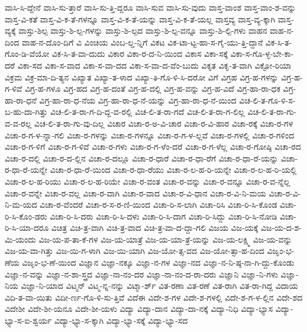 {ವಾಸಿ-ಸಿ-ದ್ದೇನೆ
ವಾಸಿ-ಸು-ತ್ತಾರೆ
ವಾಸಿ-ಸು-ತ್ತಿ-ದ್ದರೂ
ವಾಸಿ-ಸುವ
ವಾಸಿ-ಸು-ವುದು
ವಾಸ್ತ-ವಾಂಶ
ವಾಸ್ತ-ವಾಂ-ಶ-ವನ್ನು
ವಾಸ್ತ-ವಿ-ಕತೆ
ವಾಸ್ತ-ವಿ-ಕ-ತೆ-ಗಳನ್ನೂ
ವಾಸ್ತ-ವಿ-ಕ-ತೆ-ಯನ್ನು
ವಾಸ್ತ-ವಿ-ಕ-ತೆ-ಯಲ್ಲ
ವಾಸ್ತವ್ಯ
ವಾಸ್ತ-ವ್ಯ-ಕ್ಕಾಗಿ
ವಾಸ್ತ-ವ್ಯಕ್ಕೆ
ವಾಸ್ತು-ಶಿಲ್ಪ
ವಾಸ್ತು-ಶಿ-ಲ್ಪ-ಗಳನ್ನು
ವಾಸ್ತು-ಶಿ-ಲ್ಪದ
ವಾಸ್ತು-ಶಿ-ಲ್ಪ-ವನ್ನೂ
ವಾಸ್ತು-ಶಿ-ಲ್ಪಿ-ಗಳು
ವಾಹನ
ವಾಹ-ನ-ದಿಂದ
ವಾಹ-ನ-ದೊಂ-ದಿಗೆ
ವಿ
ವಿಂಚಿಯ
ವಿಂಬ-ಲ್ಡ-ನ್ನಿಗೆ
ವಿಕಟ
ವಿಕ-ಟಾ-ಟ್ಟ-ಹಾ-ಸ-ಗೈ-ಯು-ತ್ತಿ-ದ್ದಾನೆ
ವಿಕ-ಸಿ-ತ-ಗೊಂ-ಡಿ-ವೆಯೋ
ವಿಕ-ಸಿ-ತ-ವಾ-ದುದು
ವಿಕಾರ
ವಿಕಾ-ರ-ದ-ನಿ-ಯಿಂದ
ವಿಕಾಸ
ವಿಕಾ-ಸಕ್ಕೆ
ವಿಕಾ-ಸ-ಗೊ-ಳ್ಳ-ಬೇ-ಕಾ-ದರೆ
ವಿಕಾ-ಸದ
ವಿಕಾ-ಸ-ವಾದ
ವಿಕಾ-ಸ-ವಾ-ದದ
ವಿಕಾ-ಸ-ವಾ-ದ-ವೆಂ-ಬುದು
ವಿಕೃತ
ವಿಕೃ-ತ-ವಾಗಿ
ವಿಕ್ಟೋ-ರಿಯಾ
ವಿಕ್ರಮ
ವಿಕ್ರ-ಮಾ-ದಿ-ತ್ಯನ
ವಿಖ್ಯಾತ
ವಿಖ್ಯಾ-ತ-ಳಾದ
ವಿಖ್ಯಾ-ತಿ-ಗೊ-ಳಿ-ಸಿ-ದರೋ
ವಿಗೆ
ವಿಗ್ರಹ
ವಿಗ್ರ-ಹ-ಗಳನ್ನು
ವಿಗ್ರ-ಹ-ಗ-ಳಿವೆ
ವಿಗ್ರ-ಹ-ಗಳೂ
ವಿಗ್ರ-ಹದ
ವಿಗ್ರ-ಹ-ದಂತೆ
ವಿಗ್ರ-ಹ-ದಲ್ಲಿ
ವಿಗ್ರ-ಹ-ವನ್ನು
ವಿಗ್ರ-ಹ-ವಿದೆ
ವಿಗ್ರ-ಹಾ-ರಾ-ಧಕ
ವಿಗ್ರ-ಹಾ-ರಾ-ಧನೆ
ವಿಗ್ರ-ಹಾ-ರಾ-ಧ-ನೆಯ
ವಿಗ್ರ-ಹಾ-ರಾ-ಧ-ನೆ-ಯನ್ನು
ವಿಗ್ರ-ಹಾ-ರಾ-ಧ-ನೆ-ಯಿಂದ
ವಿಚ-ಲಿ-ತ-ಗೊ-ಳಿ-ಸ-ಬ-ಹು-ದಾ-ಗಿತ್ತು
ವಿಚ-ಲಿ-ತ-ರಾ-ಗ-ದಿ-ದ್ದ-ವ-ರಲ್ಲಿ
ವಿಚ-ಲಿ-ತ-ರಾ-ಗದೆ
ವಿಚ-ಲಿ-ತ-ರಾ-ಗ-ಲಿಲ್ಲ
ವಿಚ-ಲಿ-ತ-ರಾ-ಗು-ವ-ವ-ರಲ್ಲ
ವಿಚ-ಲಿ-ತ-ರಾ-ಗು-ವು-ದಿಲ್ಲ
ವಿಚಾರ
ವಿಚಾ-ರ-ಅ-ವಿ-ಚಾರ
ವಿಚಾ-ರ-ವಿ-ಹಾರ
ವಿಚಾ-ರಕ್ಕೆ
ವಿಚಾ-ರ-ಗಳ
ವಿಚಾ-ರ-ಗ-ಳ-ನ್ನಾ-ಗಲಿ
ವಿಚಾ-ರ-ಗಳನ್ನು
ವಿಚಾ-ರ-ಗಳನ್ನೂ
ವಿಚಾ-ರ-ಗ-ಳ-ಲ್ಲವೆ
ವಿಚಾ-ರ-ಗಳಲ್ಲಿ
ವಿಚಾ-ರ-ಗಳಿಂದ
ವಿಚಾ-ರ-ಗ-ಳಿಗೆ
ವಿಚಾ-ರ-ಗ-ಳಿವೆ
ವಿಚಾ-ರ-ಗಳು
ವಿಚಾ-ರ-ಗ-ಳೆಂ-ದರೆ
ವಿಚಾ-ರ-ಗ-ಳೆಲ್ಲ
ವಿಚಾ-ರ-ಗೋಷ್ಠಿ
ವಿಚಾ-ರದ
ವಿಚಾ-ರ-ದಲ್ಲಿ
ವಿಚಾ-ರ-ದ-ಲ್ಲಿನ
ವಿಚಾ-ರ-ದಲ್ಲೂ
ವಿಚಾ-ರ-ಧಾರೆ
ವಿಚಾ-ರ-ಧಾ-ರೆಗೆ
ವಿಚಾ-ರ-ಧಾ-ರೆ-ಯನ್ನು
ವಿಚಾ-ರ-ಧಾ-ರೆ-ಯನ್ನೇ
ವಿಚಾ-ರ-ಧಾ-ರೆ-ಯಿಂದ
ವಿಚಾ-ರ-ಧಾ-ರೆಯು
ವಿಚಾ-ರ-ಲ-ಹ-ರಿ-ಯನ್ನೇ
ವಿಚಾ-ರ-ಲ-ಹ-ರಿ-ಯಲ್ಲಿ
ವಿಚಾ-ರ-ಲ-ಹ-ರಿಯು
ವಿಚಾ-ರ-ಲ-ಹ-ರಿಯೇ
ವಿಚಾ-ರ-ವಂತ
ವಿಚಾ-ರ-ವನ್ನು
ವಿಚಾ-ರ-ವನ್ನೂ
ವಿಚಾ-ರ-ವ-ನ್ನೆಲ್ಲ
ವಿಚಾ-ರ-ವನ್ನೇ
ವಿಚಾ-ರ-ವಲ್ಲ
ವಿಚಾ-ರ-ವಾಗಿ
ವಿಚಾ-ರ-ವಾದ
ವಿಚಾ-ರ-ವಿ-ಧಾನ
ವಿಚಾ-ರ-ವಿ-ನಿ-ಮಯ
ವಿಚಾ-ರ-ವಿ-ನಿ-ಮ-ಯದ
ವಿಚಾ-ರ-ವೆಂದರೆ
ವಿಚಾ-ರ-ಸ-ರ-ಣಿ-ಯಿಂದ
ವಿಚಾ-ರಿ-ಸ-ಲಾಗಿ
ವಿಚಾ-ರಿಸಿ
ವಿಚಾ-ರಿ-ಸಿ-ಕೊಂಡ
ವಿಚಾ-ರಿ-ಸಿ-ಕೊಂ-ಡರು
ವಿಚಾ-ರಿ-ಸಿ-ದರು
ವಿಚಾ-ರಿ-ಸಿ-ದಳು
ವಿಚಾ-ರಿ-ಸಿ-ದಾಗ
ವಿಚಾ-ರಿ-ಸಿದ್ದು
ವಿಚಾ-ರಿ-ಸಿ-ನೋಡಿ
ವಿಚಾ-ರಿ-ಸಿ-ಯಾ-ದರೂ
ವಿಚಿತ್ರ
ವಿಚಿ-ತ್ರ-ವಾಗಿ
ವಿಚಿ-ತ್ರ-ವಾದ
ವಿಚಿ-ತ್ರ-ವಾ-ದ-ದ್ದಾ-ಗಲಿ
ವಿಜಯ
ವಿಜ-ಯಕ್ಕೆ
ವಿಜ-ಯ-ದ-ಶ-ಮಿ-ಯಂದು
ವಿಜ-ಯ-ಪ-ತಾ-ಕೆ-ಗಳ
ವಿಜ-ಯ-ಯಾತ್ರೆ
ವಿಜ-ಯ-ಯಾ-ತ್ರೆ-ಯನ್ನು
ವಿಜ-ಯ-ಲಕ್ಷ್ಮಿ
ವಿಜ-ಯ-ವನ್ನು
ವಿಜ-ಯ-ವಾ-ಗಿತ್ತು
ವಿಜ-ಯಿ-ಗ-ಳಾಗಿ
ವಿಜ-ಯಿ-ಯಾಗಿ
ವಿಜ-ಯೋ-ತ್ಸ-ವದ
ವಿಜ-ಯೋ-ತ್ಸಾ-ಹ-ದಿಂದ
ವಿಜೃಂ-ಭ-ಣೆಯ
ವಿಜೃಂ-ಭ-ಣೆ-ಯಿಂದ
ವಿಜ್ಞಾನ
ವಿಜ್ಞಾ-ನಕ್ಕೂ
ವಿಜ್ಞಾ-ನ-ಗಳ
ವಿಜ್ಞಾ-ನದ
ವಿಜ್ಞಾ-ನ-ನಿ-ಷ್ಠ-ನಾ-ಗಿ-ದ್ದು-ಕೊಂಡು
ವಿಜ್ಞಾ-ನ-ವನ್ನು
ವಿಜ್ಞಾ-ನ-ಶಾ-ಸ್ತ್ರದ
ವಿಜ್ಞಾ-ನಾ-ನಂ-ದರ
ವಿಜ್ಞಾ-ನಾ-ನಂ-ದ-ರಾ-ದರು
ವಿಜ್ಞಾನಿ
ವಿಜ್ಞಾ-ನಿ-ಗಳು
ವಿಜ್ಞಾ-ನಿಯ
ವಿಜ್ಞಾ-ನಿ-ಯಾದ
ವಿಟ್ಮನ್
ವಿಟ್ಮ-ನ್ನ-ನನ್ನು
ವಿಟ್ಮಾ-ರ್ಶ್
ವಿತ-ರಣಾ
ವಿತ-ರಣೆ
ವಿತ-ರಾಗಿ
ವಿತ-ರಾ-ಗಿದ್ದ
ವಿದಾಯ
ವಿದಿ-ತ-ವಾ-ಯಿತು
ವಿದೀ-ರ್ಣ-ಗೊ-ಳಿ-ಸು-ತ್ತಿವೆ
ವಿದೆಈ
ವಿದೇ-ಶ-ಗಳ
ವಿದೇ-ಶ-ಗಳಲ್ಲಿ
ವಿದೇ-ಶ-ಗ-ಳ-ಲ್ಲಿನ
ವಿದೇ-ಶದ
ವಿದೇಶೀ
ವಿದೇ-ಶೀ-ಯನೂ
ವಿದೇ-ಶೀ-ಯಳು
ವಿದ್ಯಾ
ವಿದ್ಯಾ-ದಾನ
ವಿದ್ಯಾ-ದಾ-ನಕ್ಕೆ
ವಿದ್ಯಾ-ನಿಧಿ
ವಿದ್ಯಾ-ಭ್ಯಾಸ
ವಿದ್ಯಾ-ಭ್ಯಾ-ಸ-ಐ-ಶ್ವರ್ಯ
ವಿದ್ಯಾ-ಭ್ಯಾ-ಸ-ಕ್ಕಾಗಿ
ವಿದ್ಯಾ-ಭ್ಯಾ-ಸಕ್ಕೆ
ವಿದ್ಯಾ-ಭ್ಯಾ-ಸದ
}
